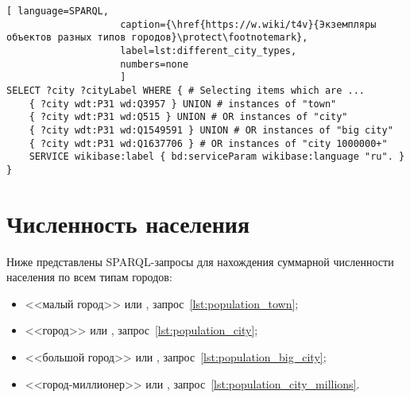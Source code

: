 \begin{lstlisting}[ language=SPARQL, 
                    caption={\href{https://w.wiki/t4v}{Экземпляры объектов разных типов городов}\protect\footnotemark},
                    label=lst:different_city_types,
                    numbers=none
                    ]
SELECT ?city ?cityLabel WHERE { # Selecting items which are ...
	{ ?city wdt:P31 wd:Q3957 } UNION # instances of "town"
	{ ?city wdt:P31 wd:Q515 } UNION # OR instances of "city"
	{ ?city wdt:P31 wd:Q1549591 } UNION # OR instances of "big city"
	{ ?city wdt:P31 wd:Q1637706 } # OR instances of "city 1000000+"                                
	SERVICE wikibase:label { bd:serviceParam wikibase:language "ru". }
}
\end{lstlisting}




\section{Численность населения}

\marginnote{ %
    \MarginQuestion
    Какие из городов названы в честь географических объектов?%
\begin{itemize}
\item \href{https://w.wiki/oL6}{Тольятти}
\item \href{https://w.wiki/oL5}{Тула}
\item \href{https://w.wiki/oL4}{Черняховск}
\item \href{https://w.wiki/oL3}{Курильск}
\item \href{https://w.wiki/oL2}{Вологда}
\item \href{https://w.wiki/oK$}{Обнинск}
\end{itemize}
См. ответ %
на с.~\pageref{answer:cities_geographic_objects}.
}

Ниже представлены SPARQL-запросы для нахождения суммарной численности населения по всем типам городов: 
\begin{itemize}[leftmargin=24pt]
	\item <<малый город>> или , запрос~\ref{lst:population_town};
	\item <<город>> или , запрос~\ref{lst:population_city};
	\item <<большой город>> или , запрос~\ref{lst:population_big_city};
	\item <<город-миллионер>> или , запрос~\ref{lst:population_city_millions}.
\end{itemize}
%




